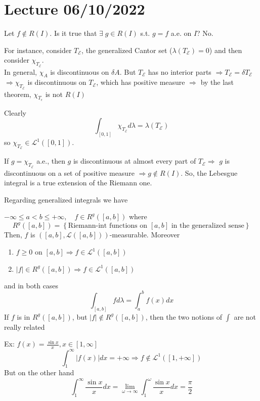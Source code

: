 \section{Lecture 06/10/2022}
Let \(f \not \in R(I)\). Is it true that \(\exists \; g \in R(I)\) s.t. \(g = f\) a.e. on \(I\)? No.

For instance, consider \(T_{\mathcal{E}}\), the generalized Cantor set (\(\lambda(T_{\mathcal{E}}) = 0\)) and then consider \(\chi_{T_{\mathcal{E}}}\). \\
In general, \(\chi_{A}\) is discontinuous on \(\delta A\).  But \(T_{\mathcal{E}}\) has no interior parts \(\Rightarrow T_{\mathcal{E}} = \delta T_{\mathcal{E}}\) \(\Rightarrow \chi_{T_{\mathcal{E}}}\) is discontinuous on \(T_{\mathcal{E}}\), which has positive measure
\(\Rightarrow \) by the last theorem, \(\chi_{T_\epsilon}\) is not \(R(I)\)

Clearly 
\[
    \int_{[0,1]} \chi_{T_{\mathcal{E}}} d\lambda = \lambda(T_{\mathcal{E}})
\]
so \(\chi_{T_{\mathcal{E}}} \in \mathcal{L}^1([0,1])\).  

If \(g = \chi_{T_{\mathcal{E}}}\) a.e., then \(g\) is discontinuous at almost every part of \(T_{\mathcal{E}} \Rightarrow\) \(g\) is discontinuous on a set of positive measure \(\Rightarrow g \not \in R(I)\). 
So, the Lebesgue integral is a true extension of the Riemann one.

Regarding generalized integrals we have

\begin{theorem}
    \(-\infty \leq a < b \leq +\infty, \quad f \in R^g([a,b])\) where 
    \[
        R^g([a,b]) = \left\lbrace \mbox{Riemann-int functions on }[a,b]\mbox{ in the generalized sense} \right\rbrace
    \]
    Then, \(f\) is \(([a,b], \mathcal{L}([a,b]))\)-measurable. Moreover
    \begin{enumerate}
        \item \(f \geq 0\) on \([a,b] \Rightarrow f \in \mathcal{L}^1([a,b])\)
        \item \(\vert f \vert \in R^g([a,b]) \Rightarrow f \in \mathcal{L}^1 ([a,b])\)
    \end{enumerate}
    and in both cases
    \[
        \int_{[a,b]} fd\lambda = \int_a^b f(x)dx
    \]
    If \(f\) is in \(R^g([a,b])\), but \(\vert f\vert \not \in R^g([a,b])\), then the two notions of \(\int\) are not really related
\end{theorem}

Ex:
\(f(x) = \frac{\sin x}{x},  x \in [1, \infty]\)
\[
    \int_1^{\infty} \vert f(x) \vert dx = +\infty \Rightarrow f \not \in \mathcal{L}^1([1, +\infty])
\]
But on the other hand
\[
    \int_1^{\infty} \frac{\sin x}{x} dx = \lim_{\omega \to \infty} \int_1^{\omega} \frac{\sin x}{x} dx = \frac{\pi}{2}
\]

